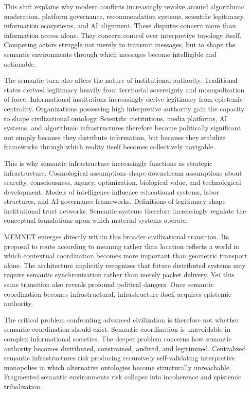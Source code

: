 \documentclass[11pt,a4paper]{article}
\begin{document}
This shift explains why modern conflicts increasingly revolve around algorithmic moderation, platform governance, recommendation systems, scientific legitimacy, information ecosystems, and AI alignment. These disputes concern more than information access alone. They concern control over interpretive topology itself. Competing actors struggle not merely to transmit messages, but to shape the semantic environments through which messages become intelligible and actionable.

The semantic turn also alters the nature of institutional authority. Traditional states derived legitimacy heavily from territorial sovereignty and monopolization of force. Informational institutions increasingly derive legitimacy from epistemic centrality. Organizations possessing high interpretive authority gain the capacity to shape civilizational ontology. Scientific institutions, media platforms, AI systems, and algorithmic infrastructures therefore become politically significant not simply because they distribute information, but because they stabilize frameworks through which reality itself becomes collectively navigable.

This is why semantic infrastructure increasingly functions as strategic infrastructure. Cosmological assumptions shape downstream assumptions about scarcity, consciousness, agency, optimization, biological value, and technological development. Models of intelligence influence educational systems, labor structures, and AI governance frameworks. Definitions of legitimacy shape institutional trust networks. Semantic systems therefore increasingly regulate the conceptual foundations upon which material systems operate.

MEMNET emerges directly within this broader civilizational transition. Its proposal to route according to meaning rather than location reflects a world in which contextual coordination becomes more important than geometric transport alone. The architecture implicitly recognizes that future distributed systems may require semantic synchronization rather than merely packet delivery. Yet this same transition also reveals profound political dangers. Once semantic coordination becomes infrastructural, infrastructure itself acquires epistemic authority.

The critical problem confronting advanced civilization is therefore not whether semantic coordination should exist. Semantic coordination is unavoidable in complex informational societies. The deeper problem concerns how semantic authority becomes distributed, constrained, audited, and legitimized. Centralized semantic infrastructures risk producing recursively self-validating interpretive monopolies in which alternative ontologies become structurally unreachable. Fragmented semantic environments risk collapse into incoherence and epistemic tribalization.
\end{document}
